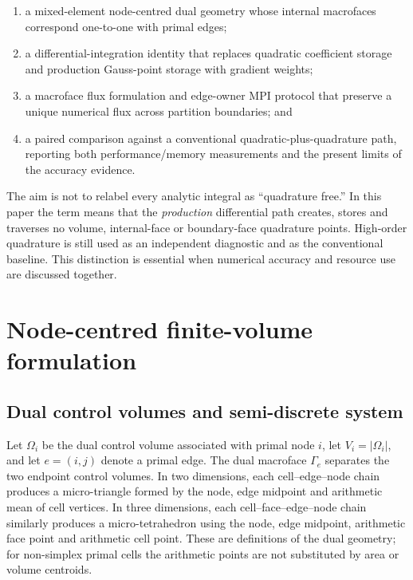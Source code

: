\documentclass[11pt]{article}
\begin{document}
\begin{enumerate}
  \item a mixed-element node-centred dual geometry whose internal macrofaces correspond one-to-one with primal edges;
  \item a differential-integration identity that replaces quadratic coefficient storage and production Gauss-point storage with gradient weights;
  \item a macroface flux formulation and edge-owner MPI protocol that preserve a unique numerical flux across partition boundaries; and
  \item a paired comparison against a conventional quadratic-plus-quadrature path, reporting both performance/memory measurements and the present limits of the accuracy evidence.
\end{enumerate}

The aim is not to relabel every analytic integral as ``quadrature free.''  In this paper the term means that the \emph{production} differential path creates, stores and traverses no volume, internal-face or boundary-face quadrature points.  High-order quadrature is still used as an independent diagnostic and as the conventional baseline.  This distinction is essential when numerical accuracy and resource use are discussed together.

\section{Node-centred finite-volume formulation}\label{sec:method}

\subsection{Dual control volumes and semi-discrete system}

Let $\Omega_i$ be the dual control volume associated with primal node $i$, let $V_i=|\Omega_i|$, and let $e=(i,j)$ denote a primal edge.  The dual macroface $\Gamma_e$ separates the two endpoint control volumes.  In two dimensions, each cell--edge--node chain produces a micro-triangle formed by the node, edge midpoint and arithmetic mean of cell vertices.  In three dimensions, each cell--face--edge--node chain similarly produces a micro-tetrahedron using the node, edge midpoint, arithmetic face point and arithmetic cell point.  These are definitions of the dual geometry; for non-simplex primal cells the arithmetic points are not substituted by area or volume centroids.
\end{document}
